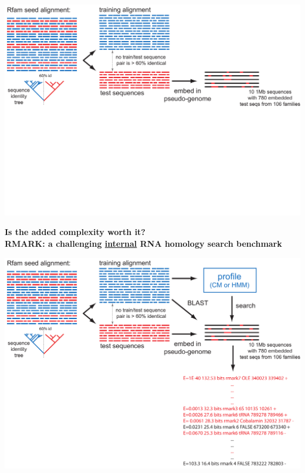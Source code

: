 \documentclass[landscape]{slides}
\begin{document}
\begin{slide}
\begin{slide}
\begin{center}
\includegraphics[width=10in]{figs/rmark-tree-1}
\end{center}

\vfill
\end{slide}
\begin{slide}
\begin{center}
\textbf{Is the added complexity worth it? \\
  RMARK: a challenging \underline{internal} RNA homology search
  benchmark}

\includegraphics[width=10in]{figs/rmark-tree-2}
\end{center}

\vfill
\end{slide}
\begin{slide}
\begin{center}


\end{center}
\end{slide}
\end{slide}
\end{document}
